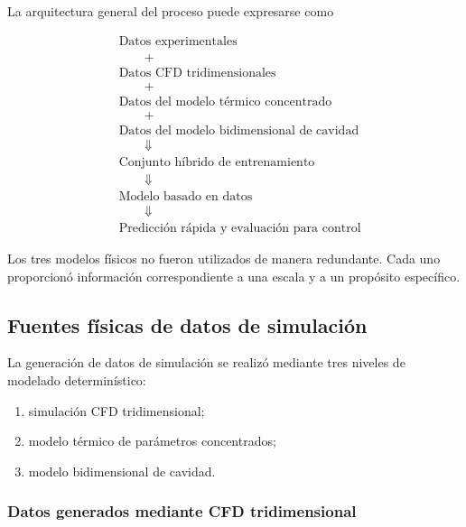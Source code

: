 La arquitectura general del proceso puede expresarse como

\begin{equation}
\boxed{
\begin{aligned}
&\text{Datos experimentales}
\\
&\qquad+
\\
&\text{Datos CFD tridimensionales}
\\
&\qquad+
\\
&\text{Datos del modelo térmico concentrado}
\\
&\qquad+
\\
&\text{Datos del modelo bidimensional de cavidad}
\\
&\qquad\Downarrow
\\
&\text{Conjunto híbrido de entrenamiento}
\\
&\qquad\Downarrow
\\
&\text{Modelo basado en datos}
\\
&\qquad\Downarrow
\\
&\text{Predicción rápida y evaluación para control}
\end{aligned}
}
\label{eq:hybrid_framework_general}
\end{equation}

Los tres modelos físicos no fueron utilizados de manera redundante. Cada uno proporcionó información correspondiente a una escala y a un propósito específico.

\subsection{Fuentes físicas de datos de simulación}
\label{subsec:fuentes_datos_simulados}

La generación de datos de simulación se realizó mediante tres niveles de modelado determinístico:

\begin{enumerate}
    \item simulación CFD tridimensional;
    \item modelo térmico de parámetros concentrados;
    \item modelo bidimensional de cavidad.
\end{enumerate}

\subsubsection{Datos generados mediante CFD tridimensional}

